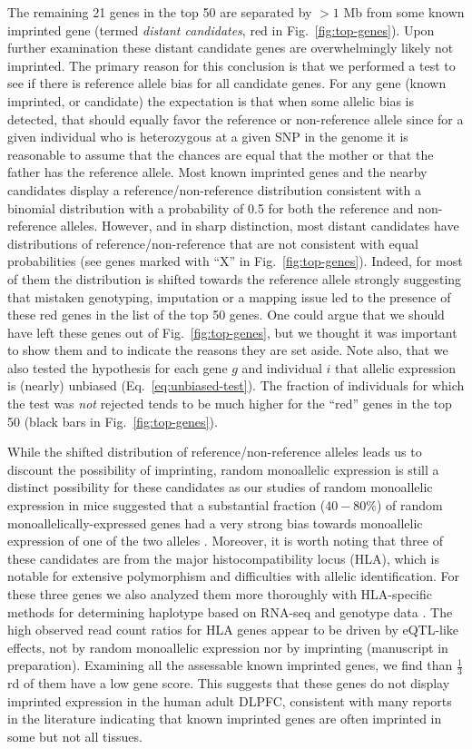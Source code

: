 \documentclass[12pt,letterpaper]{article}
\begin{document}
The remaining 21 genes in the top 50 are separated by \(>1\) Mb from some
known imprinted gene (termed \emph{distant candidates}, red in
Fig.~\ref{fig:top-genes}).  Upon further examination these distant candidate
genes are overwhelmingly likely not imprinted. The primary reason for this
conclusion is that we performed a test to see if there is reference allele
bias for all candidate genes. For any gene (known imprinted, or candidate) the
expectation is that when some allelic bias is detected, that should equally
favor the reference or non-reference allele since for a given individual who
is heterozygous at a given SNP in the genome it is reasonable to assume that
the chances are equal that the mother or that the father has the reference
allele. Most known imprinted genes and the nearby candidates display a
reference/non-reference distribution consistent with a binomial distribution
with a probability of 0.5 for both the reference and non-reference alleles.
However, and in sharp distinction, most distant candidates have distributions
of reference/non-reference that are not consistent with equal probabilities
(see genes marked with ``X'' in Fig.~\ref{fig:top-genes}).  Indeed, for most of
them the distribution is shifted towards the reference allele strongly
suggesting that mistaken genotyping, imputation or a mapping issue led to the
presence of these red genes in the list of the top 50 genes. One could argue
that we should have left these genes out of Fig.~\ref{fig:top-genes}, but we
thought it was important to show them and to indicate the reasons they are set
aside.   Note also, that we also tested the hypothesis for each gene \(g\) and
individual \(i\) that allelic expression is (nearly) unbiased
(Eq.~\ref{eq:unbiased-test}).  The fraction of individuals for which the test
was \emph{not} rejected tends to be much higher for the ``red'' genes in the
top 50 (black bars in Fig.~\ref{fig:top-genes}).

While the shifted distribution of reference/non-reference alleles leads us to
discount the possibility of imprinting, random monoallelic expression is still
a distinct possibility for these candidates as our studies of random
monoallelic expression in mice suggested that a substantial fraction
(\(40-80\%\)) of random monoallelically-expressed genes had a very strong bias
towards monoallelic expression of one of the two alleles \cite{Zwemer2012}.
Moreover, it is worth noting that three of these candidates are from the major
histocompatibility locus (HLA), which is notable for extensive polymorphism
and difficulties with allelic identification. For these three genes we also
analyzed them more thoroughly with HLA-specific methods for determining
haplotype based on RNA-seq \cite{Bai2014a} and genotype data \cite{Zheng2014}.
The high observed read count ratios for HLA genes appear to be driven by
eQTL-like effects, not by random monoallelic expression nor by imprinting
(manuscript in preparation).  Examining all the assessable known imprinted
genes, we find than \(\frac{1}{3}\)rd of them have a low gene score. This
suggests that these genes do not display imprinted expression in the human
adult DLPFC, consistent with many reports in the literature indicating that
known imprinted genes are often imprinted in some but not all tissues.  
\end{document}
